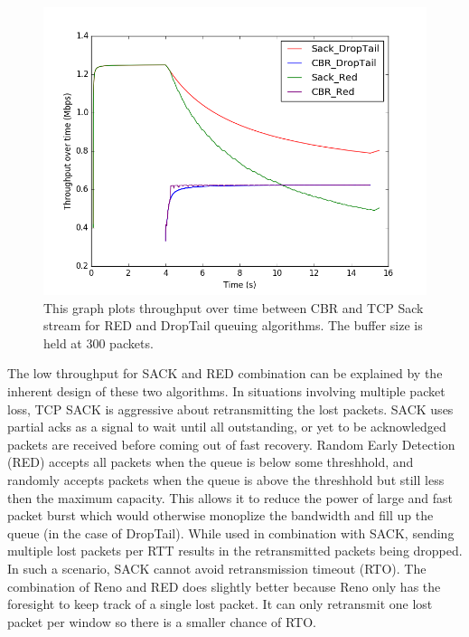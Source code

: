 \begin{figure}[!htbp]
	\includegraphics[scale=0.4]{Queuing_Sack_300.png}
	\caption{This graph plots throughput over time between CBR and TCP Sack stream for RED and DropTail queuing algorithms. The buffer size is held at 300 packets.}
	\label{fig:Queuing_Sack_300}
\end{figure}

The low throughput for SACK and RED combination can be explained by the inherent design of these two algorithms. In situations involving multiple packet loss, TCP SACK is aggressive about retransmitting the lost packets. SACK uses partial acks as a signal to wait until all outstanding, or yet to be acknowledged packets are received before coming out of fast recovery. Random Early Detection (RED) accepts all packets when the queue is below some threshhold, and randomly accepts packets when the queue is above the threshhold but still less then the maximum capacity. This allows it to reduce the power of large and fast packet burst which would otherwise monoplize the bandwidth and fill up the queue (in the case of DropTail).  While used in combination with SACK, sending multiple lost packets per RTT results in the retransmitted packets being dropped. In such a scenario, SACK cannot avoid retransmission timeout (RTO). The combination of Reno and RED does slightly better because Reno only has the foresight to keep track of a single lost packet. It can only retransmit one lost packet per window so there is a smaller chance of RTO. 


